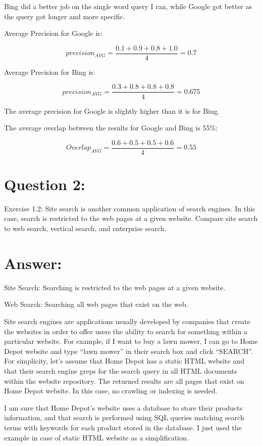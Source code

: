 \documentclass[a4paper, 11pt]{article}
\begin{document}
Bing did a better job on the single word query I ran, while Google got better as the query got longer and more specific.

Average Precision for Google is:

$$ 
precision_{AVG} = \frac{0.1 + 0.9 + 0.8 + 1.0}{4} = 0.7
$$


Average Precision for Bing is:

$$ 
precision_{AVG} = \frac{0.3 + 0.8 + 0.8 + 0.8}{4} = 0.675
$$

The average precision for Google is slightly higher than it is for Bing.

The average overlap between the results for Google and Bing is 55\%:

$$ 
Overlap_{AVG} = \frac{0.6 + 0.5 + 0.5 + 0.6}{4} = 0.55
$$
 
\section*{Question 2:}
Exercise 1.2: Site search is another common application of search engines. In this case,
search is restricted to the web pages at a given website. Compare site search to
web search, vertical search, and enterprise search.

\section*{Answer:}

Site Search: Searching is restricted to the web pages at a given website.

Web Search: Searching all web pages that exist on the web.

Site search engines are applications usually developed by companies that create the websites in order to offer users the ability to search for something within a particular website. For example, if I want to buy a lawn mower, I can go to Home Depot website and type ``lawn mower'' in their search box and click ``SEARCH''. For simplicity, let's assume that Home Depot has a static HTML website and that their search engine greps for the search query in all HTML documents within the website repository. The returned results are all pages that exist on Home Depot website. In this case, no crawling or indexing is needed.

I am sure that Home Depot's website uses a database to store their products information, and that search is performed using SQL queries matching search terms with keywords for each product stored in the database. I just used the example in case of static HTML website as a simplification.
\end{document}
